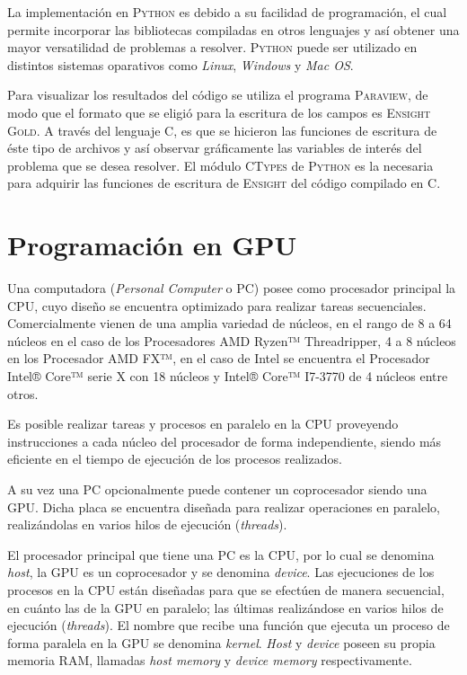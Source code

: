 La implementación en \textsc{Python} es debido a su facilidad de programación, el cual permite incorporar las bibliotecas compiladas en otros lenguajes y así obtener una mayor versatilidad de problemas a resolver. \textsc{Python} puede ser utilizado en distintos sistemas oparativos como \textit{Linux}, \textit{Windows} y \textit{Mac OS}. 

Para visualizar los resultados del código se utiliza el programa \textsc{Paraview}, de modo que el formato que se eligió para la escritura de los campos es \textsc{Ensight Gold}. A través del lenguaje \textsc{C}, es que se hicieron las funciones de escritura de éste tipo de archivos y así observar gráficamente las variables de interés del problema que se desea resolver. El módulo \textsc{CTypes} de \textsc{Python} es la necesaria para adquirir las funciones de escritura de \textsc{Ensight} del código compilado en \textsc{C}.



\section{Programación en GPU}
\label{sec_pc}

Una computadora (\textit{Personal Computer} o PC) posee como procesador principal la CPU, cuyo diseño se encuentra optimizado para realizar tareas secuenciales. Comercialmente vienen de una amplia variedad de núcleos, en el rango de 8 a 64 núcleos en el caso de los Procesadores AMD Ryzen™ Threadripper, 4 a 8 núcleos en los Procesador AMD FX™, en el caso de Intel se encuentra el Procesador Intel® Core™ serie X con 18 núcleos y  Intel® Core™ I7-3770 de 4 núcleos entre otros. \cite{edp:2020:amd} \cite{icp:2020:intel}

Es posible realizar tareas y procesos en paralelo en la CPU proveyendo instrucciones a cada núcleo del procesador de forma independiente, siendo más eficiente en el tiempo de ejecución de los procesos realizados.

A su vez una PC opcionalmente puede contener un coprocesador siendo una GPU. Dicha placa se encuentra diseñada para realizar operaciones en paralelo, realizándolas en varios hilos de ejecución (\textit{threads}).




El procesador principal que tiene una PC es la CPU, por lo cual se denomina \textit{host}, la GPU es un coprocesador y se denomina \textit{device}. Las ejecuciones de los procesos en la CPU están diseñadas para que se efectúen de manera secuencial, en cuánto las de la GPU en paralelo; las últimas realizándose en varios hilos de ejecución (\textit{threads}). El nombre que recibe una función que ejecuta un proceso de forma paralela en la GPU se denomina \textit{kernel}. \textit{Host} y \textit{device} poseen su propia memoria RAM, llamadas \textit{host memory} y \textit{device memory} respectivamente. \cite{rinaldi2011modelos}

